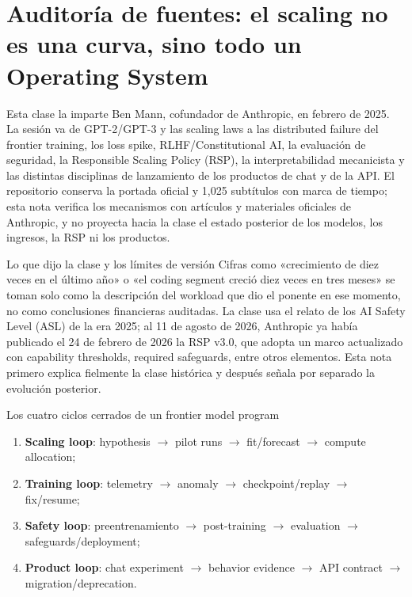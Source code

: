 \section{Auditoría de fuentes: el scaling no es una curva, sino todo un Operating System}

Esta clase la imparte Ben Mann, cofundador de Anthropic, en febrero de 2025. La sesión va de GPT-2/GPT-3 y las scaling laws a las distributed failure del frontier training, los loss spike, RLHF/Constitutional AI, la evaluación de seguridad, la Responsible Scaling Policy (RSP), la interpretabilidad mecanicista y las distintas disciplinas de lanzamiento de los productos de chat y de la API. El repositorio conserva la portada oficial y 1,025 subtítulos con marca de tiempo; esta nota verifica los mecanismos con artículos y materiales oficiales de Anthropic, y no proyecta hacia la clase el estado posterior de los modelos, los ingresos, la RSP ni los productos.

\begin{warningbox}{Lo que dijo la clase y los límites de versión}
Cifras como «crecimiento de diez veces en el último año» o «el coding segment creció diez veces en tres meses» se toman solo como la descripción del workload que dio el ponente en ese momento, no como conclusiones financieras auditadas. La clase usa el relato de los AI Safety Level (ASL) de la era 2025; al 11 de agosto de 2026, Anthropic ya había publicado el 24 de febrero de 2026 la RSP v3.0, que adopta un marco actualizado con capability thresholds, required safeguards, entre otros elementos. Esta nota primero explica fielmente la clase histórica y después señala por separado la evolución posterior.
\end{warningbox}

\begin{importantbox}{Los cuatro ciclos cerrados de un frontier model program}
\begin{enumerate}
  \item \textbf{Scaling loop}: hypothesis $\rightarrow$ pilot runs $\rightarrow$ fit/forecast $\rightarrow$ compute allocation;
  \item \textbf{Training loop}: telemetry $\rightarrow$ anomaly $\rightarrow$ checkpoint/replay $\rightarrow$ fix/resume;
  \item \textbf{Safety loop}: preentrenamiento $\rightarrow$ post-training $\rightarrow$ evaluation $\rightarrow$ safeguards/deployment;
  \item \textbf{Product loop}: chat experiment $\rightarrow$ behavior evidence $\rightarrow$ API contract $\rightarrow$ migration/deprecation.
\end{enumerate}
\end{importantbox}


